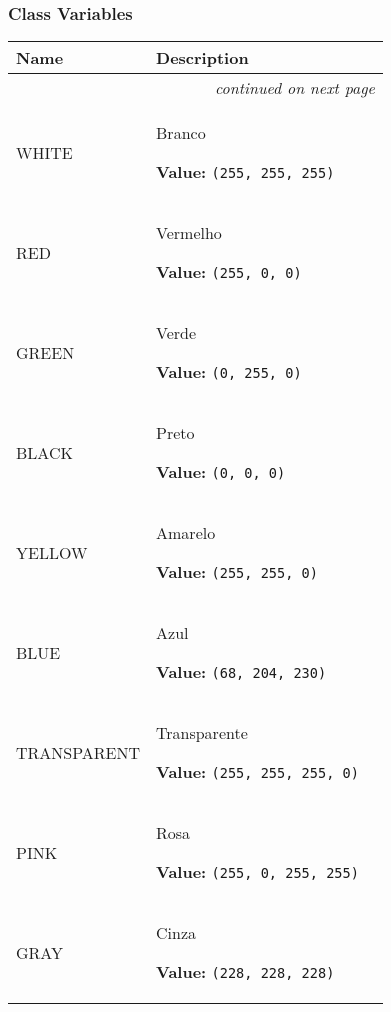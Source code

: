   \subsubsection{Class Variables}

    \vspace{-1cm}
\hspace{\varindent}\begin{longtable}{|p{\varnamewidth}|p{\vardescrwidth}|l}
\cline{1-2}
\cline{1-2} \centering \textbf{Name} & \centering \textbf{Description}& \\
\cline{1-2}
\endhead\cline{1-2}\multicolumn{3}{r}{\small\textit{continued on next page}}\\\endfoot\cline{1-2}
\endlastfoot\raggedright W\-H\-I\-T\-E\- & \raggedright Branco

\textbf{Value:} 
{\tt \texttt{(}255\texttt{, }255\texttt{, }255\texttt{)}}&\\
\cline{1-2}
\raggedright R\-E\-D\- & \raggedright Vermelho

\textbf{Value:} 
{\tt \texttt{(}255\texttt{, }0\texttt{, }0\texttt{)}}&\\
\cline{1-2}
\raggedright G\-R\-E\-E\-N\- & \raggedright Verde

\textbf{Value:} 
{\tt \texttt{(}0\texttt{, }255\texttt{, }0\texttt{)}}&\\
\cline{1-2}
\raggedright B\-L\-A\-C\-K\- & \raggedright Preto

\textbf{Value:} 
{\tt \texttt{(}0\texttt{, }0\texttt{, }0\texttt{)}}&\\
\cline{1-2}
\raggedright Y\-E\-L\-L\-O\-W\- & \raggedright Amarelo

\textbf{Value:} 
{\tt \texttt{(}255\texttt{, }255\texttt{, }0\texttt{)}}&\\
\cline{1-2}
\raggedright B\-L\-U\-E\- & \raggedright Azul

\textbf{Value:} 
{\tt \texttt{(}68\texttt{, }204\texttt{, }230\texttt{)}}&\\
\cline{1-2}
\raggedright T\-R\-A\-N\-S\-P\-A\-R\-E\-N\-T\- & \raggedright Transparente

\textbf{Value:} 
{\tt \texttt{(}255\texttt{, }255\texttt{, }255\texttt{, }0\texttt{)}}&\\
\cline{1-2}
\raggedright P\-I\-N\-K\- & \raggedright Rosa

\textbf{Value:} 
{\tt \texttt{(}255\texttt{, }0\texttt{, }255\texttt{, }255\texttt{)}}&\\
\cline{1-2}
\raggedright G\-R\-A\-Y\- & \raggedright Cinza

\textbf{Value:} 
{\tt \texttt{(}228\texttt{, }228\texttt{, }228\texttt{)}}&\\
\cline{1-2}
\end{longtable}

